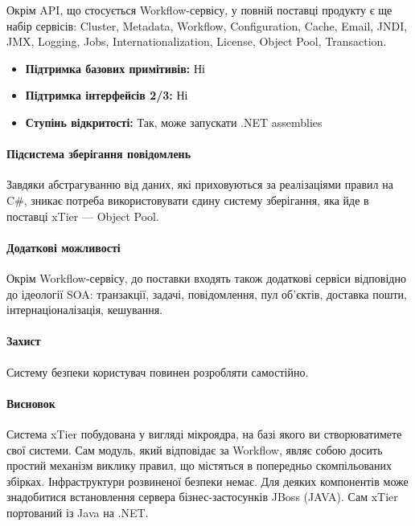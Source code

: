 \documentclass{memoir}
\begin{document}
Окрім API, що стосується Workflow-сервісу, у повній поставці продукту є ще набір сервісів: Cluster, Metadata, Workflow, Configuration, Cache, Email, JNDI, JMX, Logging, Jobs, Internationalization, License, Object Pool, Transaction.

\begin{itemize}
    \item \textbf{Підтримка базових примітивів:} Ні
    \item \textbf{Підтримка інтерфейсів 2/3:} Ні
    \item \textbf{Ступінь відкритості:} Так, може запускати .NET assemblies
\end{itemize}

\paragraph{Підсистема зберігання повідомлень}

Завдяки абстрагуванню від даних, які приховуються за реалізаціями правил на C\#, зникає потреба використовувати єдину систему зберігання, яка йде в поставці xTier — Object Pool.

\paragraph{Додаткові можливості}

Окрім Workflow-сервісу, до поставки входять також додаткові сервіси відповідно до ідеології SOA: транзакції, задачі, повідомлення, пул об’єктів, доставка пошти, інтернаціоналізація, кешування.

\paragraph{Захист}

Систему безпеки користувач повинен розробляти самостійно.

\paragraph{Висновок}

Система xTier побудована у вигляді мікроядра, на базі якого ви створюватимете свої системи. Сам модуль, який відповідає за Workflow, являє собою досить простий механізм виклику правил, що містяться в попередньо скомпільованих збірках. Інфраструктури розвиненої безпеки немає. Для деяких компонентів може знадобитися встановлення сервера бізнес-застосунків JBoss (JAVA). Сам xTier портований із Java на .NET.
\end{document}
